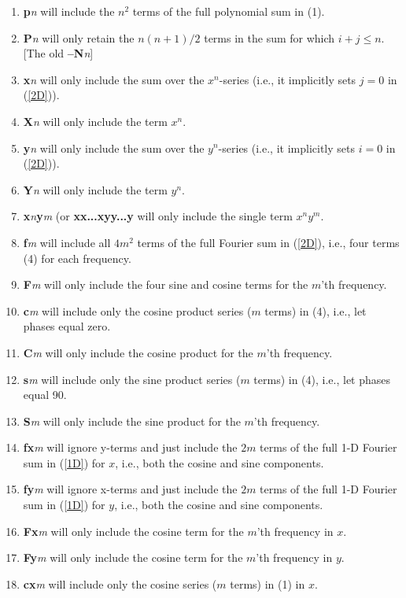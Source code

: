 \documentclass[12pt,letterpaper,margin=0.5in]{report}
\begin{document}
\begin{enumerate}
	\item {\bf p}{\it n} will include the $n^2$ terms of the full polynomial sum in (1).
	\item {\bf P}{\it n} will only retain the $n(n+1)/2$ terms in the sum for which $i+j \leq n$.  [The old {\bf --N}{\it n}]
	\item {\bf x}{\it n} will only include the sum over the $x^n$-series (i.e., it implicitly sets $j = 0$ in (\ref{2D})).
	\item {\bf X}{\it n} will only include the term $x^n$.
	\item {\bf y}{\it n} will only include the sum over the $y^n$-series (i.e., it implicitly sets $i = 0$ in (\ref{2D})).
	\item {\bf Y}{\it n} will only include the term $y^n$.
	\item {\bf x}{\it n}{\bf y}{\it m} (or {\bf xx...xyy...y} will only include the single term $x^ny^m$.
	\item {\bf f}{\it m} will include all $4m^2$ terms of the full Fourier sum in (\ref{2D}), i.e., four terms (4) for each frequency.
	\item {\bf F}{\it m} will only include the four sine and cosine terms for the $m$'th frequency.
	\item {\bf c}{\it m} will include only the cosine product series ($m$ terms) in (4), i.e., let phases equal zero.
	\item {\bf C}{\it m} will only include the cosine product for the $m$'th frequency.
	\item {\bf s}{\it m} will include only the sine product series ($m$ terms) in (4), i.e., let phases equal 90.
	\item {\bf S}{\it m} will only include the sine product for the $m$'th frequency.
	\item {\bf fx}{\it m} will ignore y-terms and just include the $2m$ terms of the full 1-D Fourier sum in (\ref{1D}) for $x$, i.e., both the cosine and sine components.
	\item {\bf fy}{\it m} will ignore x-terms and just include the $2m$ terms of the full 1-D Fourier sum in (\ref{1D}) for $y$, i.e., both the cosine and sine components.
	\item {\bf Fx}{\it m} will only include the cosine term for the $m$'th frequency in $x$.
	\item {\bf Fy}{\it m} will only include the cosine term for the $m$'th frequency in $y$.
	\item {\bf cx}{\it m} will include only the cosine series ($m$ terms) in (1) in $x$.

\end{enumerate}
\end{document}
